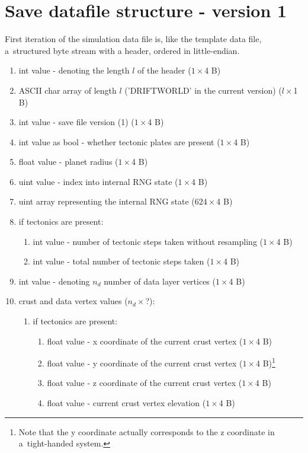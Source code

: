 \section{Save datafile structure - version 1}
\label{sec:save-datafile-structure}
First iteration of the simulation data file is, like the template data file, a~structured byte stream with a header, ordered in little-endian.

\begin{enumerate}
\item int value - denoting the length $l$ of the header ($1\times$4 B)
\item ASCII char array of length $l$ ('DRIFTWORLD' in the current version) ($l\times$1 B)
\item int value - save file version (1) ($1\times$4 B)
\item int value as bool - whether tectonic plates are present ($1\times$4 B)
\item float value - planet radius ($1\times$4 B)
\item uint value - index into internal RNG state ($1\times$4 B)
\item uint array representing the internal RNG state ($624\times$4 B)
\item if tectonics are present:
\begin{enumerate}
\item int value - number of tectonic steps taken without resampling ($1\times$4 B)
\item int value - total number of tectonic steps taken ($1\times$4 B)
\end{enumerate}
\item int value - denoting $n_d$ number of data layer vertices ($1\times$4 B)
\item crust and data vertex values ($n_d\times$?):
\begin{enumerate}
\item if tectonics are present:
\begin{enumerate}
\item float value - x coordinate of the current crust vertex ($1\times$4 B)
\item float value - y coordinate of the current crust vertex ($1\times$4 B)\footnote{Note that the y coordinate actually corresponds to the z coordinate in a~tight-handed system.}
\item float value - z coordinate of the current crust vertex ($1\times$4 B)
\item float value - current crust vertex elevation ($1\times$4 B)

\end{enumerate}
\end{enumerate}
\end{enumerate}
